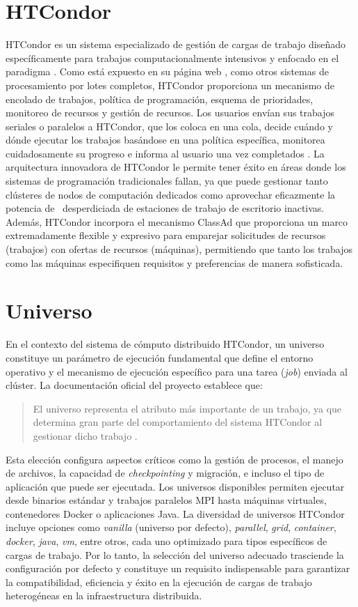 \section{HTCondor}
\noindent
HTCondor es un sistema especializado de gestión de cargas de trabajo diseñado específicamente para trabajos computacionalmente intensivos y enfocado en el paradigma \HTC. Como está expuesto en su página web \citep{HTCondor-what-is-HTCondor}, como otros sistemas de procesamiento por lotes completos, HTCondor proporciona un mecanismo de encolado de trabajos, política de programación, esquema de prioridades, monitoreo de recursos y gestión de recursos. Los usuarios envían sus trabajos seriales o paralelos a HTCondor, que los coloca en una cola, decide cuándo y dónde ejecutar los trabajos basándose en una política específica, monitorea cuidadosamente su progreso e informa al usuario una vez completados \citep{HTCondor-what-is-HTCondor}. La arquitectura innovadora de HTCondor le permite tener éxito en áreas donde los sistemas de programación tradicionales fallan, ya que puede gestionar tanto clústeres de nodos de computación dedicados como aprovechar eficazmente la potencia de \CPU~desperdiciada de estaciones de trabajo de escritorio inactivas. Además, HTCondor incorpora el mecanismo ClassAd que proporciona un marco extremadamente flexible y expresivo para emparejar solicitudes de recursos (trabajos) con ofertas de recursos (máquinas), permitiendo que tanto los trabajos como las máquinas especifiquen requisitos y preferencias de manera sofisticada.

\section{Universo}
\noindent
En el contexto del sistema de cómputo distribuido HTCondor, un universo constituye un parámetro de ejecución fundamental que define el entorno operativo y el mecanismo de ejecución específico para una tarea (\textit{job}) enviada al clúster. La documentación oficial del proyecto establece que:

\begin{quote}
	El universo representa el atributo más importante de un trabajo, ya que determina gran parte del comportamiento del sistema HTCondor al gestionar dicho trabajo \citep{HTCondor-what-is-a-job}.
\end{quote}

\noindent
Esta elección configura aspectos críticos como la gestión de procesos, el manejo de archivos, la capacidad de \textit{checkpointing} y migración, e incluso el tipo de aplicación que puede ser ejecutada. Los universos disponibles permiten ejecutar desde binarios estándar y trabajos paralelos MPI hasta máquinas virtuales, contenedores Docker o aplicaciones Java. La diversidad de universos HTCondor incluye opciones como \textit{vanilla} (universo por defecto), \textit{parallel}, \textit{grid}, \textit{container}, \textit{docker}, \textit{java}, \textit{vm}, entre otros, cada uno optimizado para tipos específicos de cargas de trabajo. Por lo tanto, la selección del universo adecuado trasciende la configuración por defecto y constituye un requisito indispensable para garantizar la compatibilidad, eficiencia y éxito en la ejecución de cargas de trabajo heterogéneas en la infraestructura distribuida.
